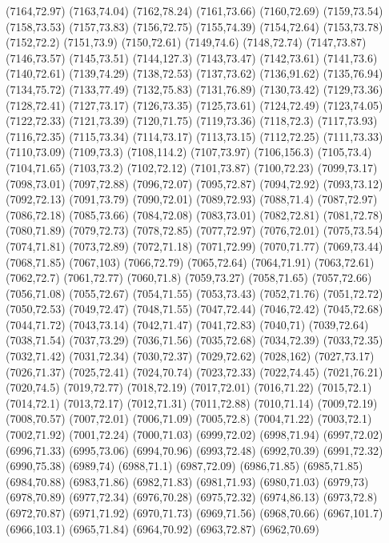 (7164,72.97)
(7163,74.04)
(7162,78.24)
(7161,73.66)
(7160,72.69)
(7159,73.54)
(7158,73.53)
(7157,73.83)
(7156,72.75)
(7155,74.39)
(7154,72.64)
(7153,73.78)
(7152,72.2)
(7151,73.9)
(7150,72.61)
(7149,74.6)
(7148,72.74)
(7147,73.87)
(7146,73.57)
(7145,73.51)
(7144,127.3)
(7143,73.47)
(7142,73.61)
(7141,73.6)
(7140,72.61)
(7139,74.29)
(7138,72.53)
(7137,73.62)
(7136,91.62)
(7135,76.94)
(7134,75.72)
(7133,77.49)
(7132,75.83)
(7131,76.89)
(7130,73.42)
(7129,73.36)
(7128,72.41)
(7127,73.17)
(7126,73.35)
(7125,73.61)
(7124,72.49)
(7123,74.05)
(7122,72.33)
(7121,73.39)
(7120,71.75)
(7119,73.36)
(7118,72.3)
(7117,73.93)
(7116,72.35)
(7115,73.34)
(7114,73.17)
(7113,73.15)
(7112,72.25)
(7111,73.33)
(7110,73.09)
(7109,73.3)
(7108,114.2)
(7107,73.97)
(7106,156.3)
(7105,73.4)
(7104,71.65)
(7103,73.2)
(7102,72.12)
(7101,73.87)
(7100,72.23)
(7099,73.17)
(7098,73.01)
(7097,72.88)
(7096,72.07)
(7095,72.87)
(7094,72.92)
(7093,73.12)
(7092,72.13)
(7091,73.79)
(7090,72.01)
(7089,72.93)
(7088,71.4)
(7087,72.97)
(7086,72.18)
(7085,73.66)
(7084,72.08)
(7083,73.01)
(7082,72.81)
(7081,72.78)
(7080,71.89)
(7079,72.73)
(7078,72.85)
(7077,72.97)
(7076,72.01)
(7075,73.54)
(7074,71.81)
(7073,72.89)
(7072,71.18)
(7071,72.99)
(7070,71.77)
(7069,73.44)
(7068,71.85)
(7067,103)
(7066,72.79)
(7065,72.64)
(7064,71.91)
(7063,72.61)
(7062,72.7)
(7061,72.77)
(7060,71.8)
(7059,73.27)
(7058,71.65)
(7057,72.66)
(7056,71.08)
(7055,72.67)
(7054,71.55)
(7053,73.43)
(7052,71.76)
(7051,72.72)
(7050,72.53)
(7049,72.47)
(7048,71.55)
(7047,72.44)
(7046,72.42)
(7045,72.68)
(7044,71.72)
(7043,73.14)
(7042,71.47)
(7041,72.83)
(7040,71)
(7039,72.64)
(7038,71.54)
(7037,73.29)
(7036,71.56)
(7035,72.68)
(7034,72.39)
(7033,72.35)
(7032,71.42)
(7031,72.34)
(7030,72.37)
(7029,72.62)
(7028,162)
(7027,73.17)
(7026,71.37)
(7025,72.41)
(7024,70.74)
(7023,72.33)
(7022,74.45)
(7021,76.21)
(7020,74.5)
(7019,72.77)
(7018,72.19)
(7017,72.01)
(7016,71.22)
(7015,72.1)
(7014,72.1)
(7013,72.17)
(7012,71.31)
(7011,72.88)
(7010,71.14)
(7009,72.19)
(7008,70.57)
(7007,72.01)
(7006,71.09)
(7005,72.8)
(7004,71.22)
(7003,72.1)
(7002,71.92)
(7001,72.24)
(7000,71.03)
(6999,72.02)
(6998,71.94)
(6997,72.02)
(6996,71.33)
(6995,73.06)
(6994,70.96)
(6993,72.48)
(6992,70.39)
(6991,72.32)
(6990,75.38)
(6989,74)
(6988,71.1)
(6987,72.09)
(6986,71.85)
(6985,71.85)
(6984,70.88)
(6983,71.86)
(6982,71.83)
(6981,71.93)
(6980,71.03)
(6979,73)
(6978,70.89)
(6977,72.34)
(6976,70.28)
(6975,72.32)
(6974,86.13)
(6973,72.8)
(6972,70.87)
(6971,71.92)
(6970,71.73)
(6969,71.56)
(6968,70.66)
(6967,101.7)
(6966,103.1)
(6965,71.84)
(6964,70.92)
(6963,72.87)
(6962,70.69)
